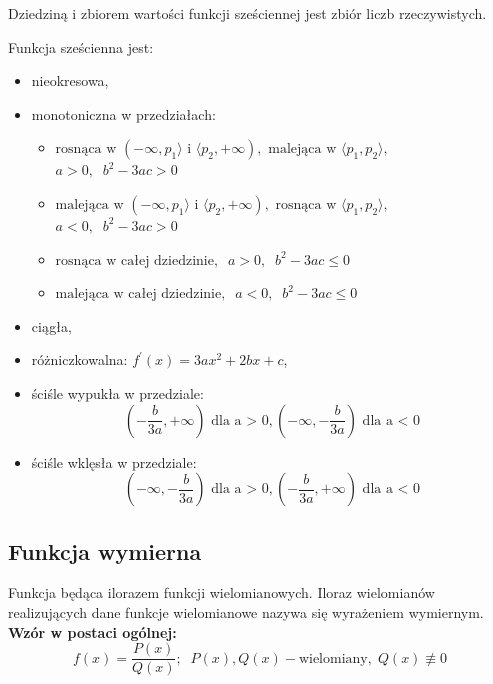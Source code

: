 \documentclass[14pt,a4paper]{extarticle}
\begin{document}
\noindent Dziedziną i zbiorem wartości funkcji sześciennej jest zbiór liczb rzeczywistych.\hfill\break

\noindent Funkcja sześcienna jest:
\begin{itemize}
   \item nieokresowa,
   \item monotoniczna w przedziałach:
\begin{itemize}
   \item $\text{rosnąca w }(-\infty, p_{1}\rangle\text{ i }\langle p_{2}, +\infty), \text{ malejąca w } \langle p_{1}, p_{2}\rangle,$\\ $ a > 0, \;\;b^{2} - 3ac > 0$
   \item $\text{malejąca w }(-\infty, p_{1}\rangle\text{ i }\langle p_{2}, +\infty), \text{ rosnąca w } \langle p_{1}, p_{2}\rangle,$\\ $ a < 0, \;\;b^{2} - 3ac > 0$
   \item $\text{rosnąca w całej dziedzinie}, \;\;a > 0, \;\;b^{2} - 3ac \leq 0$
   \item $\text{malejąca w całej dziedzinie}, \;\;a < 0, \;\;b^{2} - 3ac \leq 0$
\end{itemize}

   \item ciągła,
   \item różniczkowalna: $f^{\prime}(x) = 3ax^{2} + 2bx + c$,
   \item ściśle wypukła w przedziale:
   $$\left(-\frac{b}{3a}, +\infty\right) \text{ dla a > 0}, \left(-\infty, -\frac{b}{3a}\right) \text{ dla a < 0}$$
   \item ściśle wklęsła w przedziale:
   $$\left(-\infty, -\frac{b}{3a}\right) \text{ dla a > 0}, \left(-\frac{b}{3a}, +\infty\right) \text{ dla a < 0}$$

\end{itemize}

\subsection{Funkcja wymierna}
Funkcja będąca ilorazem funkcji wielomianowych. 
Iloraz wielomianów realizujących dane funkcje wielomianowe nazywa się wyrażeniem wymiernym.
\noindent\textbf{Wzór w postaci ogólnej:}
$$f(x) = \frac{P(x)}{Q(x)};\;\;P(x), Q(x) - \text{wielomiany}, \;Q(x) \not\equiv 0$$
\end{document}
